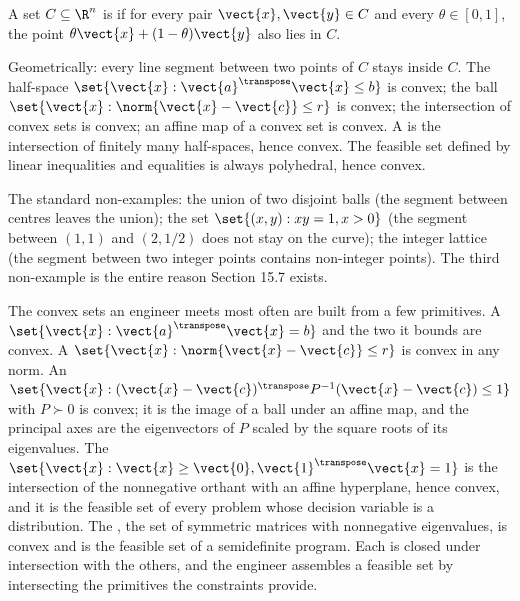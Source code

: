 \begin{definition}
A set $C \subseteq \R^{n}$ is  if for every pair
$\vect{x}, \vect{y} \in C$ and every $\theta \in [0, 1]$, the
point $\theta \vect{x} + (1 - \theta) \vect{y}$ also lies in $C$.
\end{definition}

Geometrically: every line segment between two points of $C$ stays
inside $C$. The half-space $\set{\vect{x} : \vect{a}^{\transpose}
\vect{x} \leq b}$ is convex; the ball $\set{\vect{x} :
\norm{\vect{x} - \vect{c}} \leq r}$ is convex; the intersection of
convex sets is convex; an affine map of a convex set is convex. A
 is the intersection of finitely many
half-spaces, hence convex. The feasible set defined by linear
inequalities and equalities is always polyhedral, hence convex.

The standard non-examples: the union of two disjoint balls (the
segment between centres leaves the union); the set $\set{(x, y) :
xy = 1, x > 0}$ (the segment between $(1, 1)$ and $(2, 1/2)$ does
not stay on the curve); the integer lattice (the segment between
two integer points contains non-integer points). The third
non-example is the entire reason Section 15.7 exists.

The convex sets an engineer meets most often are built from a few
primitives. A  $\set{\vect{x} :
\vect{a}^{\transpose} \vect{x} = b}$ and the two  it bounds are convex. A 
$\set{\vect{x} : \norm{\vect{x} - \vect{c}} \leq r}$ is convex in
any norm. An  $\set{\vect{x} :
(\vect{x} - \vect{c})^{\transpose} P^{-1} (\vect{x} - \vect{c})
\leq 1}$ with $P \succ 0$ is convex; it is the image of a ball
under an affine map, and the principal axes are the eigenvectors
of $P$ scaled by the square roots of its eigenvalues. The
 $\set{\vect{x} : \vect{x} \geq
\vect{0}, \vect{1}^{\transpose} \vect{x} = 1}$ is the intersection
of the nonnegative orthant with an affine hyperplane, hence convex,
and it is the feasible set of every problem whose decision variable
is a distribution. The , the
set of symmetric matrices with nonnegative eigenvalues, is convex
and is the feasible set of a semidefinite program. Each is closed
under intersection with the others, and the engineer assembles a
feasible set by intersecting the primitives the constraints
provide.

